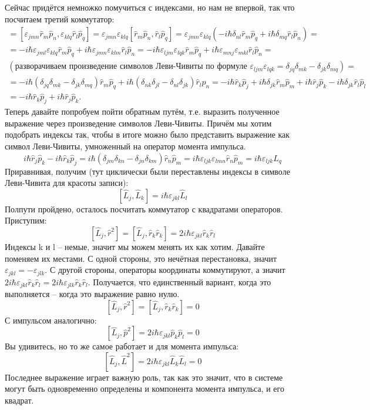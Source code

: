 Сейчас придётся немножко помучиться с индексами, но нам не впервой, так что посчитаем третий коммутатор:
\begin{multline*}
    [\hat{L}_j, \hat{L}_k] = [\varepsilon_{jmn} \hat{r}_m \hat{p}_n, \varepsilon_{klq} \hat{r}_l\hat{p}_q] = \varepsilon_{jmn}\varepsilon_{klq}[\hat{r}_m \hat{p}_n, \hat{r}_l\hat{p}_q] = \varepsilon_{jmn}\varepsilon_{klq}(-i\hbar\delta_{nl}\hat{r}_m\hat{p}_q + i\hbar\delta_{mq}\hat{r}_l\hat{p}_n) = \\
    = -i\hbar\varepsilon_{jml}\varepsilon_{klq}\hat{r}_m\hat{p}_q + i\hbar\varepsilon_{jmn}\varepsilon_{klm}\hat{r}_l\hat{p}_n = -i\hbar\varepsilon_{ljm}\varepsilon_{lqk}\hat{r}_m\hat{p}_q + i\hbar\varepsilon_{mnj}\varepsilon_{mkl}\hat{r}_l\hat{p}_n = \\(\text{разворачиваем произведение символов Леви-Чивиты по формуле } \varepsilon_{ljm}\varepsilon_{lqk} = \delta_{jq}\delta_{mk} - \delta_{jk}\delta_{mq})= \\
    = -i\hbar(\delta_{jq}\delta_{mk} - \delta_{jk}\delta_{mq})\hat{r}_m\hat{p}_q + i\hbar(\delta_{nk}\delta_{jl} - \delta_{nl}\delta_{jk})\hat{r}_l\hat{p}_n = -i\hbar\hat{r}_k\hat{p}_j + i\hbar\delta_{jk}\hat{r}_m\hat{p}_m + i\hbar\hat{r}_j\hat{p}_k - i\hbar\delta_{jk}\hat{r}_l\hat{p}_l \\= -i\hbar\hat{r}_k\hat{p}_j + i\hbar\hat{r}_j\hat{p}_k.
\end{multline*}
Теперь давайте попробуем пойти обратным путём, т.е. выразить полученное выражение через произведение символов Леви-Чивиты. Причём мы хотим подобрать индексы так, чтобы в итоге можно было представить выражение как символ Леви-Чивиты, умноженный на оператор момента импульса.
\[
i\hbar\hat{r}_j\hat{p}_k - i\hbar\hat{r}_k\hat{p}_j = i\hbar(\delta_{jm}\delta_{kn} - \delta_{jn}\delta_{km})\hat{r}_n\hat{p}_m = i\hbar\varepsilon_{ljk}\varepsilon_{lmn}\hat{r}_n\hat{p}_m = i\hbar\varepsilon_{ljk}\hat{L}_q
\]
Приравнивая, получим (тут циклически были переставлены индексы в символе Леви-Чивита для красоты записи):
\[
[\hat{L}_j, \hat{L}_k] = i\hbar\varepsilon_{jkl}\hat{L}_l
\]
Полпути пройдено, осталось посчитать коммутатор с квадратами операторов. Приступим:
\[
[\hat{L}_j, \hat{r}^2] = [\hat{L}_j, \hat{r}_k\hat{r}_k] = 2i\hbar\varepsilon_{jkl}\hat{r}_k\hat{r}_l
\]
Индексы k и l -- немые, значит мы можем менять их как хотим. Давайте поменяем их местами. С одной стороны, это нечётная перестановка, значит $\varepsilon_{jkl} = -\varepsilon_{jlk}$. С другой стороны, операторы координаты коммутируют, а значит $2i\hbar\varepsilon_{jkl}\hat{r}_k\hat{r}_l = 2i\hbar\varepsilon_{jlk}\hat{r}_k\hat{r}_l$. Получается, что единственный вариант, когда это выполняется -- когда это выражение равно нулю.
\[
[\hat{L}_j, \hat{r}^2] = [\hat{L}_j, \hat{r}_k\hat{r}_k] = 0
\]
С импульсом аналогично:
\[
[\hat{L}_j, \hat{p}^2] = 2i\hbar\varepsilon_{jkl}\hat{p}_k\hat{p}_l = 0
\]
Вы удивитесь, но то же самое работает и для момента импульса:
\[
[\hat{L}_j, \hat{L}^2] = 2i\hbar\varepsilon_{jkl}\hat{L}_k\hat{L}_l = 0
\]
Последнее выражение играет важную роль, так как это значит, что в системе могут быть одновременно определены и компонента момента импульса, и его квадрат.

